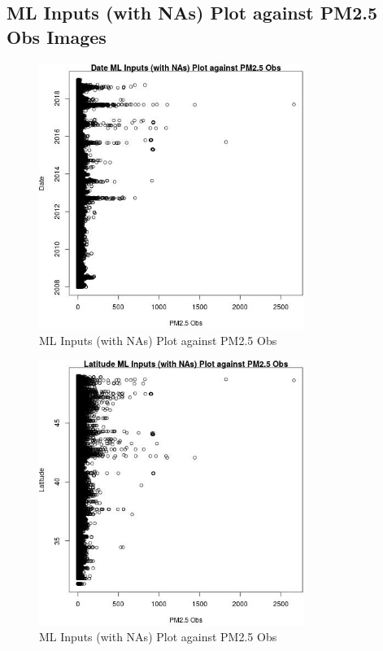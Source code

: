 
\subsection{ML Inputs (with NAs) Plot against PM2.5 Obs Images} 
 

\begin{figure} 
\centering  
\includegraphics[width=0.77\textwidth]{Code_Outputs/Report_ML_input_PM25_Step4_part_e_de_duplicated_aves2008-18_noNAMwNAs_DatevPM25_Obs.jpg} 
\caption{\label{fig:Report_ML_input_PM25_Step4_part_e_de_duplicated_aves2008-18_noNAMwNAsDatevPM25_Obs}ML Inputs (with NAs) Plot against PM2.5 Obs} 
\end{figure} 
 

\begin{figure} 
\centering  
\includegraphics[width=0.77\textwidth]{Code_Outputs/Report_ML_input_PM25_Step4_part_e_de_duplicated_aves2008-18_noNAMwNAs_LatitudevPM25_Obs.jpg} 
\caption{\label{fig:Report_ML_input_PM25_Step4_part_e_de_duplicated_aves2008-18_noNAMwNAsLatitudevPM25_Obs}ML Inputs (with NAs) Plot against PM2.5 Obs} 
\end{figure} 
 

